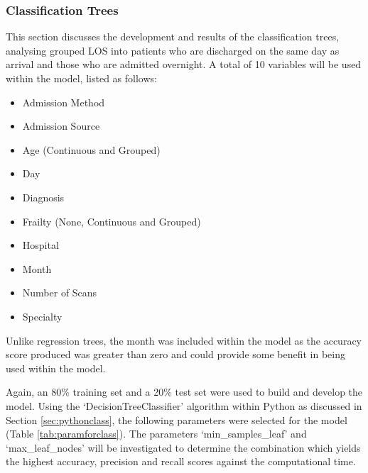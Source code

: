 \documentclass[../thesis.tex]{subfiles}
\begin{document}
\subsubsection{Classification Trees}
This section discusses the development and results of the classification trees, analysing grouped LOS into patients who are discharged on the same day as arrival and those who are admitted overnight. A total of 10 variables will be used within the model, listed as follows:
\begin{multicols}{2}
    \begin{itemize}
        \item Admission Method
        \item Admission Source
        \item Age (Continuous and Grouped)
        \item Day
        \item Diagnosis
        \item Frailty (None, Continuous and Grouped)
        \item Hospital
        \item Month
        \item Number of Scans
        \item Specialty
    \end{itemize}
\end{multicols}

Unlike regression trees, the month was included within the model as the accuracy score produced was greater than zero and could provide some benefit in being used within the model. 

Again, an 80\% training set and a 20\% test set were used to build and develop the model. Using the `DecisionTreeClassifier' algorithm within Python as discussed in Section \ref{sec:pythonclass}, the following parameters were selected for the model (Table \ref{tab:paramforclass}). The parameters `min\_samples\_leaf' and `max\_leaf\_nodes' will be investigated to determine the combination which yields the highest accuracy, precision and recall scores against the computational time.
\end{document}
